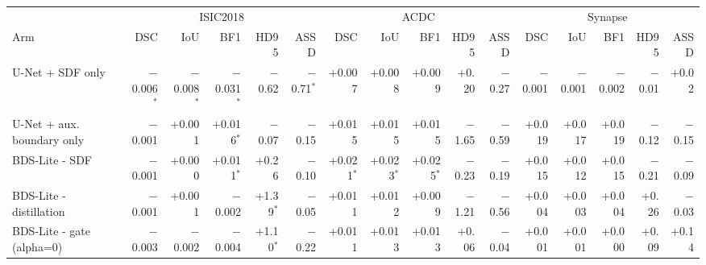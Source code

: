 \begin{tabular}{lrrrrrrrrrrrrrrr}
\toprule
 & \multicolumn{5}{c}{ISIC2018} & \multicolumn{5}{c}{ACDC} & \multicolumn{5}{c}{Synapse} \\
Arm & DSC & IoU & BF1 & HD95 & ASSD & DSC & IoU & BF1 & HD95 & ASSD & DSC & IoU & BF1 & HD95 & ASSD \\
\midrule
U-Net + SDF only & $-$0.006$^{*}$ & $-$0.008$^{*}$ & $-$0.031$^{*}$ & $-$0.62 & $-$0.71$^{*}$ & +0.007 & +0.008 & +0.009 & +0.20 & $-$0.27 & $-$0.001 & $-$0.001 & $-$0.002 & $-$0.01 & +0.02 \\
U-Net + aux. boundary only & $-$0.001 & +0.001 & +0.016$^{*}$ & $-$0.07 & $-$0.15 & +0.015 & +0.015 & +0.015 & $-$1.65 & $-$0.59 & +0.019 & +0.017 & +0.019 & $-$0.12 & $-$0.15 \\
BDS-Lite - SDF & $-$0.001 & +0.000 & +0.011$^{*}$ & +0.26 & $-$0.10 & +0.021$^{*}$ & +0.023$^{*}$ & +0.025$^{*}$ & $-$0.23 & $-$0.19 & +0.015 & +0.012 & +0.015 & $-$0.21 & $-$0.09 \\
BDS-Lite - distillation & $-$0.001 & +0.001 & $-$0.002 & +1.39$^{*}$ & $-$0.05 & +0.011 & +0.012 & +0.009 & $-$1.21 & $-$0.56 & +0.004 & +0.003 & +0.004 & +0.26 & $-$0.03 \\
BDS-Lite - gate (alpha=0) & $-$0.003 & $-$0.002 & $-$0.004 & +1.10$^{*}$ & $-$0.22 & +0.011 & +0.013 & +0.013 & +0.06 & $-$0.04 & +0.001 & +0.001 & +0.000 & +0.09 & +0.14 \\
\bottomrule
\end{tabular}
